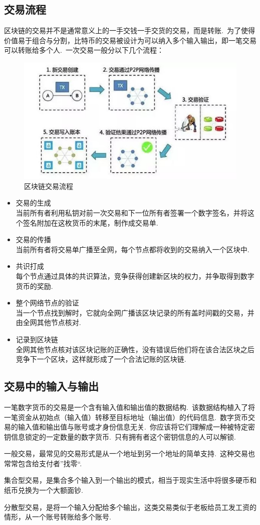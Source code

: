 \documentclass[a4paper,12pt,titlepage]{ctexart}
\begin{document}
\subsection{交易流程}
区块链的交易并不是通常意义上的一手交钱一手交货的交易，而是转账.~为了使得价值易于组合与分割，比特币的交易被设计为可以纳入多个输入输出，即一笔交易可以转账给多个人.~一次交易一般分以下几个流程：
\begin{figure}[!hbp]
	\centering
	\includegraphics[scale=0.8]{fig4.jpg}
    \caption{区块链交易流程}
\end{figure}
\begin{itemize}
\item 交易的生成\\
当前所有者利用私钥对前一次交易和下一位所有者签署一个数字签名，并将这个签名附加在这枚货币的末尾，制作成交易单.~
\item 交易的传播\\
当前所有者将交易单广播至全网，每个节点都将收到的交易纳入一个区块中.~
\item 共识打成\\
每个节点通过具体的共识算法，竞争获得创建新区块的权力，并争取得到数字货币的奖励.~
\item 整个网络节点的验证\\
当一个节点找到解时，它就向全网广播该区块记录的所有盖时间戳的交易，并由全网其他节点核对.~
\item 记录到区块链\\
全网其他节点核对该区块记账的正确性，没有错误后他们将在该合法区块之后竞争下一个区块，这样就形成了一个合法记账的区块链.~
\end{itemize}

\subsection{交易中的输入与输出}
一笔数字货币的交易是一个含有输入值和输出值的数据结构.~该数据结构植入了将一笔资金从初始点（输入值）转移至目标地址（输出值）的代码信息.~数字货币交易的输入值和输出值与账号或才身份信息无关.~你应该将它们理解成一种被特定密钥信息锁定的一定数量的数字货币.~只有拥有者这个密钥信息的人可以解锁.~\par
一般交易，最常见的交易形式是从一个地址到另一个地址的简单支持.~这种交易也常常包含给支付者”找零“.~\par
集合型交易，是集合多个输入到一个输出的模式，相当于现实生活中将很多硬币和纸币兑换为一个大额面钞.~\par
分散型交易，是将一个输入分配给多个输出，这类交易类似于老板给员工发工资的情形，从一个账号转账给多个账号.~
\end{document}
